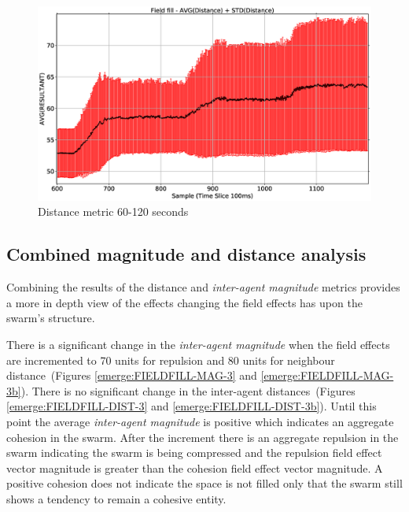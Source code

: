 \begin{figure}[H]
\begin{center}
\includegraphics[width=12cm]{CHAPTER-8/figures/FIELDFILL-DIST-2}
\end{center}
\caption{Distance metric 60-120 seconds\label{emerge:FIELDFILL-DIST-2}}
\end{figure}

\subsection{Combined magnitude and distance analysis}
Combining the results of the distance and \textit{inter-agent magnitude} metrics provides a more in depth view of the effects changing the field effects has upon the swarm's structure.

There is a significant change in the \textit{inter-agent magnitude} when the field effects are incremented to 70 units for repulsion and 80 units for neighbour distance~(Figures \ref{emerge:FIELDFILL-MAG-3} and \ref{emerge:FIELDFILL-MAG-3b}). There is no significant change in the inter-agent distances~(Figures \ref{emerge:FIELDFILL-DIST-3} and \ref{emerge:FIELDFILL-DIST-3b}). Until this point the average \textit{inter-agent magnitude} is positive which indicates an aggregate cohesion in the swarm. After the increment there is an aggregate repulsion in the swarm indicating the swarm is being compressed and the repulsion field effect vector magnitude is greater than the cohesion field effect vector magnitude. A positive cohesion does not indicate the space is not filled only that the swarm still shows a tendency to remain a cohesive entity.

